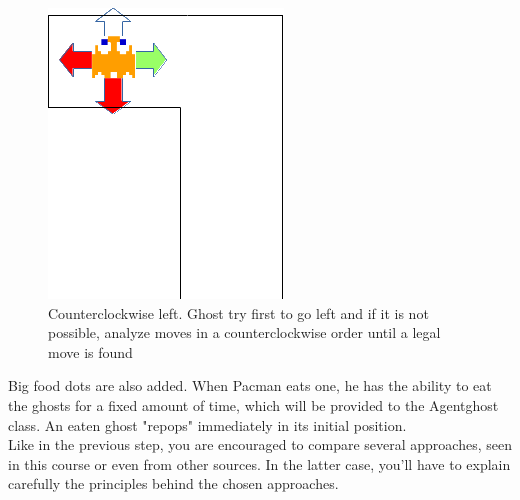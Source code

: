 \documentclass[12pt,a4paper,BCOR12mm, headexclude, footexclude, twoside, openright]{scrartcl}
\numberwithin{equation}{section} %
\numberwithin{figure}{section} %
\numberwithin{table}{section} %
\begin{document}
\begin{figure}
	\label{counterclockwise}
	\begin{center}
	
	\includegraphics[scale=1]{ghostclockwiseleft.png}
    \caption{Counterclockwise left. Ghost try first to go left and if it is not possible, analyze moves in a counterclockwise order until a legal move is found}
    \end{center}
\end{figure}



Big food dots are also added. When Pacman eats one, he has the ability to eat the ghosts for a fixed amount of time, which will be provided to the Agentghost class. An eaten ghost "repops" immediately in its initial position.\\

Like in the previous step, you are encouraged to compare several approaches, seen in this course or even from other sources. In the latter case, you'll have to explain carefully the principles behind the chosen approaches.
\end{document}
